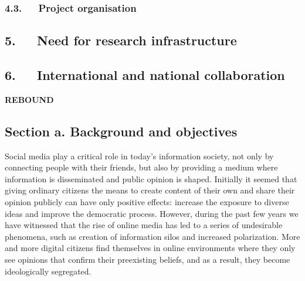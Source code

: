 \documentclass[a4paper,11pt]{article}
\begin{document}
\subsubsection*{4.3.~~~Project organisation}



\subsection*{5.~~~Need for research infrastructure}

\subsection*{6.~~~International and national collaboration}



\newpage
\begin{center}

{\LARGE\bf REBOUND} %
\end{center}


\subsection*{Section a. Background and objectives}

Social media play a critical role in today's information society, 
not only by connecting people with their friends, 
but also by providing a medium where information is disseminated and public opinion is shaped.
Initially it seemed that giving ordinary citizens the means to create content of their own
and share their opinion publicly 
can have only positive effects: increase the exposure to diverse ideas
and improve the democratic process.
However, during the past few years we have witnessed that
the rise of online media has led to 
a series of undesirable phenomena, 
such as creation of information silos and increased polarization.
More and more digital citizens find themselves in online environments
where they only see opinions that confirm their preexisting beliefs,
and as a result, they become ideologically segregated.
\end{document}
